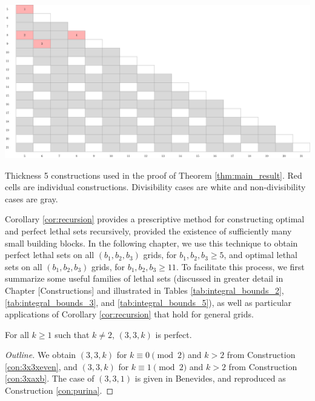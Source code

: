 \begin{table}[]
\centering
\includegraphics[width=\textwidth]{tables/2/thickness_5.pdf}
\caption{Thickness 5 constructions used in the proof of Theorem \ref{thm:main_result}. Red cells are individual constructions. Divisibility cases are white and non-divisibility cases are gray.}
\label{tab:integral_bounds_5}
\end{table}

Corollary \ref{cor:recursion} provides a prescriptive method for constructing optimal and perfect lethal sets recursively, provided the existence of sufficiently many small building blocks. In the following chapter, we use this technique to obtain perfect lethal sets on all $(b_1,b_2,b_3)$ grids, for $b_1,b_2,b_3 \geq 5$, and optimal lethal sets on all $(b_1,b_2,b_3)$ grids, for $b_1,b_2,b_3 \geq 11$. To facilitate this process, we first summarize some useful families of lethal sets (discussed in greater detail in Chapter [Constructions] and illustrated in Tables \ref{tab:integral_bounds_2}, \ref{tab:integral_bounds_3}, and \ref{tab:integral_bounds_5}), as well as particular applications of Corollary \ref{cor:recursion} that hold for general grids. 

\begin{prop}
\label{prop:3x3xk}
For all $k \geq 1$ such that $k \neq 2$, $(3,3,k)$ is perfect.
\end{prop}

\begin{proof}[Outline]
We obtain $(3,3,k)$ for $k \equiv 0 \pmod 2$ and $k > 2$ from Construction \ref{con:3x3xeven}, and $(3,3,k)$ for $k \equiv 1 \pmod 2$ and $k > 2$ from Construction \ref{con:3xaxb}. The case of $(3,3,1)$ is given in Benevides, and reproduced as Construction \ref{con:purina}.
\end{proof}

